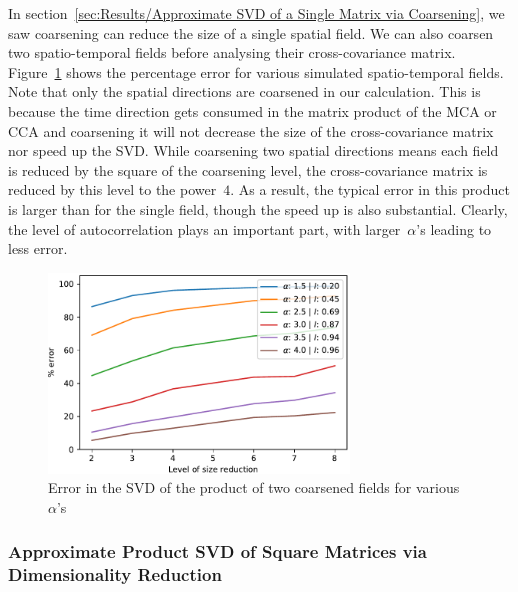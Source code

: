 \documentclass[ijgi,article,submit,moreauthors,pdftex,10pt,a4paper]{Definitions/mdpi}
\begin{document}
In section~\ref{sec:Results/Approximate SVD of a Single Matrix via Coarsening}, we saw coarsening can reduce the size of a single spatial field. We can also coarsen two spatio-temporal fields before analysing their cross-covariance matrix. Figure~\ref{fig:plotProductSpatialTemporalFieldsViaCoarsening} shows the percentage error for various simulated spatio-temporal fields. Note that only the spatial directions are coarsened in our calculation. This is because the time direction gets consumed in the matrix product of the MCA or CCA and coarsening it will not decrease the size of the cross-covariance matrix nor speed up the SVD. While coarsening two spatial directions means each field is reduced by the square of the coarsening level, the cross-covariance matrix is reduced by this level to the power~$4$. As a result, the typical error in this product is larger than for the single field, though the speed up is also substantial. Clearly, the level of autocorrelation plays an important part, with larger~$\alpha$'s leading to less error.%

\begin{figure}[H]
\centering
\includegraphics[width=80mm]{Results/plotProductSpatialTemporalFieldsViaCoarsening.pdf}
\caption[Error after coarsening]{Error in the SVD of the product of two coarsened fields for various $\alpha$'s}
\label{fig:plotProductSpatialTemporalFieldsViaCoarsening}
\end{figure}

\subsubsection{Approximate Product SVD of Square Matrices via Dimensionality Reduction}
\label{sec:Results/Approximate Product SVD of Square Matrices via Dimensionality Reduction}
\end{document}
